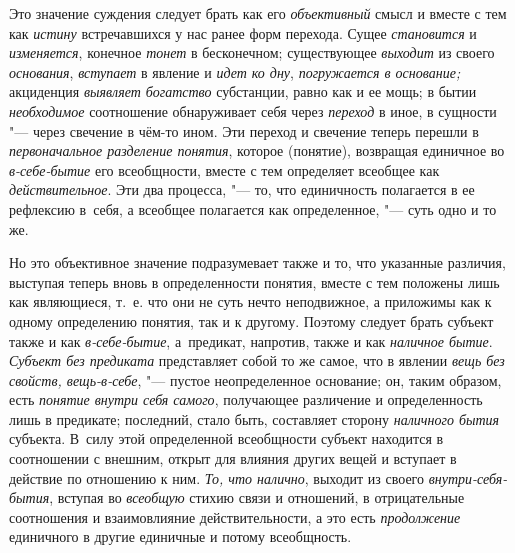 \label{bkm:bm31a}Это значение суждения следует брать как его {\em объективный}
смысл и вместе с тем как {\em истину} встречавшихся у нас ранее форм перехода.
Сущее {\em становится} и {\em изменяется}, конечное {\em тонет} в бесконечном;
существующее {\em выходит} из своего {\em основания}, {\em вступает} в явление
и {\em идет ко дну}, {\em погружается в основание;} акциденция {\em выявляет
богатство} субстанции, равно как и ее мощь; в бытии {\em необходимое}
соотношение обнаруживает себя через {\em переход} в иное, в сущности "--- через
свечение в чём-то ином. Эти переход и свечение теперь перешли
в {\em первоначальное разделение понятия}, которое (понятие), возвращая
единичное во {\em в-себе-бытие} его всеобщности, вместе с тем определяет
всеобщее как {\em действительное}. Эти два процесса, "--- то, что единичность
полагается в ее рефлексию в~себя, а всеобщее полагается как
определенное, "--- суть одно и то же.

Но это объективное значение подразумевает также и то, что
указанные различия, выступая теперь вновь в определенности понятия, вместе
с тем положены лишь как являющиеся, т.~е. что они не суть нечто
неподвижное, а приложимы как к одному определению понятия, так и к другому.
Поэтому следует брать субъект также и как {\em в-себе-бытие},
а~предикат, напротив, также и как {\em наличное бытие}.
{\em Субъект без предиката} представляет собой то же самое, что в явлении
{\em вещь без свойств, вещь-в-себе}, "--- пустое неопределенное
основание; он, таким образом, есть {\em понятие внутри себя самого},
получающее различение и определенность лишь в предикате;
последний, стало быть, составляет сторону {\em наличного бытия}
субъекта. В~силу этой определенной всеобщности субъект
находится в соотношении с внешним, открыт для влияния других вещей и
вступает в действие по отношению к ним. {\em То, что налично}, выходит
из своего {\em внутри-себя-бытия}, вступая во {\em всеобщую}
стихию связи и отношений, в отрицательные соотношения и
взаимовлияние действительности, а это есть {\em продолжение}
единичного в другие единичные и потому всеобщность.

